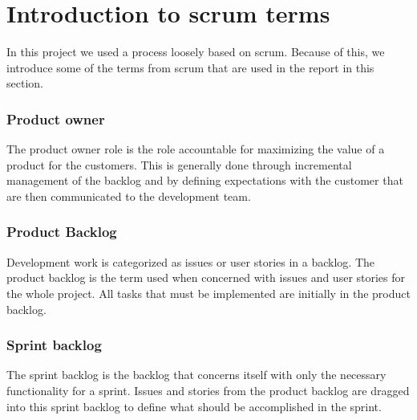 \section{Introduction to scrum terms}\label{sec:scrum_terms}
In this project we used a process loosely based on scrum.
Because of this, we introduce some of the terms from scrum that are used in the report in this section.

\subsubsection{Product owner}
The product owner role is the role accountable for maximizing the value of a product for the customers.
This is generally done through incremental management of the backlog and by defining expectations with the customer that are then communicated to the development team.

\subsubsection{Product Backlog}
Development work is categorized as issues or user stories in a backlog.
The product backlog is the term used when concerned with issues and user stories for the whole project.
All tasks that must be implemented are initially in the product backlog. 

\subsubsection{Sprint backlog}
The sprint backlog is the backlog that concerns itself with only the necessary functionality for a sprint.
Issues and stories from the product backlog are dragged into this sprint backlog to define what should be accomplished in the sprint. 
